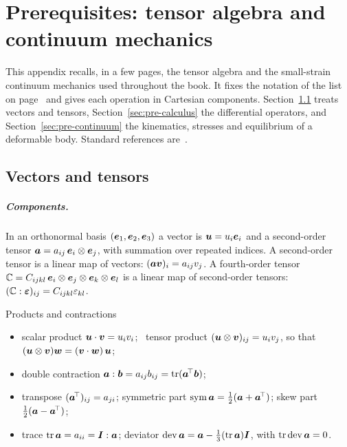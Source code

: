 \chapter{Prerequisites: tensor algebra and continuum mechanics}\label{app:prereq}

This appendix recalls, in a few pages, the tensor algebra and the small-strain
continuum mechanics used throughout the book. It fixes the notation of the
list on page~\pageref{front:notation} and gives each operation in
Cartesian components. Section~\ref{sec:pre-tensors} treats vectors and
tensors, Section~\ref{sec:pre-calculus} the differential operators, and
Section~\ref{sec:pre-continuum} the kinematics, stresses and equilibrium of a
deformable body. Standard references are~\cite{SalenconPre,GurtinPre,ChadwickPre}.

\section{Vectors and tensors}\label{sec:pre-tensors}
%
\paragraph{Components.} In an orthonormal basis $(\bm{e}_1,\bm{e}_2,\bm{e}_3)$ a vector is
$\bm{u}=u_i\bm{e}_i$ and a second-order tensor $\bm{a}=a_{ij}\,\bm{e}_i\otimes\bm{e}_j$, with
summation over repeated indices. A second-order tensor is a linear map of
vectors: $(\bm{a}\bm{v})_i=a_{ij}v_j$. A fourth-order tensor
$\mathbb{C}=C_{ijkl}\,\bm{e}_i\otimes\bm{e}_j\otimes\bm{e}_k\otimes\bm{e}_l$ is a linear map of
second-order tensors: $(\mathbb{C}:\bm{\varepsilon})_{ij}=C_{ijkl}\varepsilon_{kl}$.

\begin{gbox}{Products and contractions}
\begin{itemize}
  \item scalar product $\bm{u}\cdot\bm{v}=u_iv_i$; \ tensor product
  $(\bm{u}\otimes\bm{v})_{ij}=u_iv_j$, so that $(\bm{u}\otimes\bm{v})\bm{w}=(\bm{v}\cdot\bm{w})\,\bm{u}$;
  \item double contraction $\bm{a}:\bm{b}=a_{ij}b_{ij}=\operatorname{tr}(\bm{a}^{\!\top}\bm{b})$;
  \item transpose $(\bm{a}^{\!\top})_{ij}=a_{ji}$; symmetric part
  $\operatorname{sym}\bm{a}=\tfrac12(\bm{a}+\bm{a}^{\!\top})$; skew part $\tfrac12(\bm{a}-\bm{a}^{\!\top})$;
  \item trace $\operatorname{tr}\bm{a}=a_{ii}=\bm{I}:\bm{a}$; deviator
  $\operatorname{dev}\bm{a}=\bm{a}-\tfrac13(\operatorname{tr}\bm{a})\bm{I}$, with $\operatorname{tr}\operatorname{dev}\bm{a}=0$.
\end{itemize}
\end{gbox}

